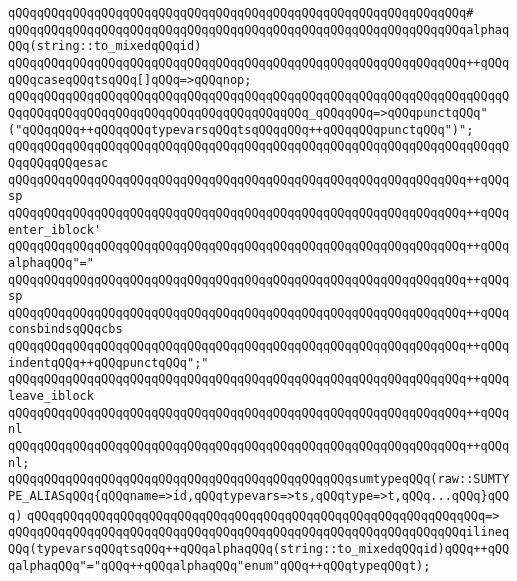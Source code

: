 \verb|qQQqqQQqqQQqqQQqqQQqqQQqqQQqqQQqqQQqqQQqqQQqqQQqqQQqqQQqqQQqqQQq#|\newline
\verb|qQQqqQQqqQQqqQQqqQQqqQQqqQQqqQQqqQQqqQQqqQQqqQQqqQQqqQQqqQQqqQQqalphaqQQq(string::to_mixedqQQqid)|\newline
\verb|qQQqqQQqqQQqqQQqqQQqqQQqqQQqqQQqqQQqqQQqqQQqqQQqqQQqqQQqqQQqqQQq++qQQqqQQqcaseqQQqtsqQQq[]qQQq=>qQQqnop;|\newline
\verb|qQQqqQQqqQQqqQQqqQQqqQQqqQQqqQQqqQQqqQQqqQQqqQQqqQQqqQQqqQQqqQQqqQQqqQQqqQQqqQQqqQQqqQQqqQQqqQQqqQQqqQQqqQQqqQQq_qQQqqQQq=>qQQqpunctqQQq"("qQQqqQQq++qQQqqQQqtypevarsqQQqtsqQQqqQQq++qQQqqQQqpunctqQQq")";|\newline
\verb|qQQqqQQqqQQqqQQqqQQqqQQqqQQqqQQqqQQqqQQqqQQqqQQqqQQqqQQqqQQqqQQqqQQqqQQqqQQqqQQqesac|\newline
\verb|qQQqqQQqqQQqqQQqqQQqqQQqqQQqqQQqqQQqqQQqqQQqqQQqqQQqqQQqqQQqqQQq++qQQqsp|\newline
\verb|qQQqqQQqqQQqqQQqqQQqqQQqqQQqqQQqqQQqqQQqqQQqqQQqqQQqqQQqqQQqqQQq++qQQqenter_iblock'|\newline
\verb|qQQqqQQqqQQqqQQqqQQqqQQqqQQqqQQqqQQqqQQqqQQqqQQqqQQqqQQqqQQqqQQq++qQQqalphaqQQq"="|\newline
\verb|qQQqqQQqqQQqqQQqqQQqqQQqqQQqqQQqqQQqqQQqqQQqqQQqqQQqqQQqqQQqqQQq++qQQqsp|\newline
\verb|qQQqqQQqqQQqqQQqqQQqqQQqqQQqqQQqqQQqqQQqqQQqqQQqqQQqqQQqqQQqqQQq++qQQqconsbindsqQQqcbs|\newline
\verb|qQQqqQQqqQQqqQQqqQQqqQQqqQQqqQQqqQQqqQQqqQQqqQQqqQQqqQQqqQQqqQQq++qQQqindentqQQq++qQQqpunctqQQq";"|\newline
\verb|qQQqqQQqqQQqqQQqqQQqqQQqqQQqqQQqqQQqqQQqqQQqqQQqqQQqqQQqqQQqqQQq++qQQqleave_iblock|\newline
\verb|qQQqqQQqqQQqqQQqqQQqqQQqqQQqqQQqqQQqqQQqqQQqqQQqqQQqqQQqqQQqqQQq++qQQqnl|\newline
\verb|qQQqqQQqqQQqqQQqqQQqqQQqqQQqqQQqqQQqqQQqqQQqqQQqqQQqqQQqqQQqqQQq++qQQqnl;|\newline
\newline
\verb|qQQqqQQqqQQqqQQqqQQqqQQqqQQqqQQqqQQqqQQqqQQqqQQqsumtypeqQQq(raw::SUMTYPE_ALIASqQQq{qQQqname=>id,qQQqtypevars=>ts,qQQqtype=>t,qQQq...qQQq}qQQq)|\newline
\verb|qQQqqQQqqQQqqQQqqQQqqQQqqQQqqQQqqQQqqQQqqQQqqQQqqQQqqQQqqQQqqQQq=>|\newline
\verb|qQQqqQQqqQQqqQQqqQQqqQQqqQQqqQQqqQQqqQQqqQQqqQQqqQQqqQQqqQQqqQQqilineqQQq(typevarsqQQqtsqQQq++qQQqalphaqQQq(string::to_mixedqQQqid)qQQq++qQQqalphaqQQq"="qQQq++qQQqalphaqQQq"enum"qQQq++qQQqtypeqQQqt);|\newline
